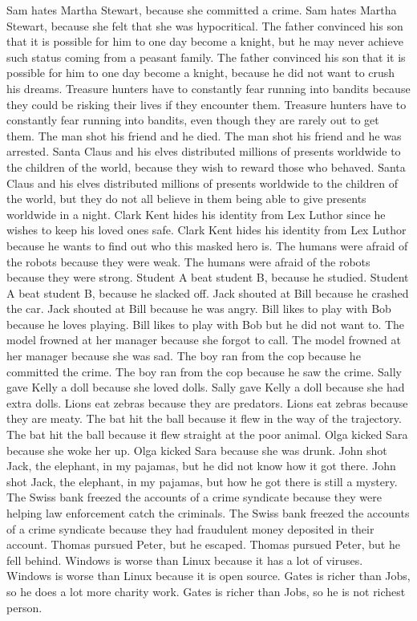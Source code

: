 \documentclass{article}
\begin{document}
\begin{enumerate}
	Sam hates Martha Stewart, because she committed a crime.
	Sam hates Martha Stewart, because she felt that she was hypocritical.
	The father convinced his son that it is possible for him to one day become a knight, but he may never achieve such status coming from a peasant family.
	The father convinced his son that it is possible for him to one day become a knight, because he did not want to crush his dreams.
	Treasure hunters have to constantly fear running into bandits because they could be risking their lives if they encounter them.
	Treasure hunters have to constantly fear running into bandits, even though they are rarely out to get them.
	The man shot his friend and he died.
	The man shot his friend and he was arrested.
	Santa Claus and his elves distributed millions of presents worldwide to the children of the world, because they wish to reward those who behaved.
	Santa Claus and his elves distributed millions of presents worldwide to the children of the world, but they do not all believe in them being able to give presents worldwide in a night.
	Clark Kent hides his identity from Lex Luthor since he wishes to keep his loved ones safe.
	Clark Kent hides his identity from Lex Luthor because he wants to find out who this masked hero is.
	The humans were afraid of the robots because they were weak.
	The humans were afraid of the robots because they were strong.
	Student A beat student B, because he studied.
	Student A beat student B, because he slacked off.
	Jack shouted at Bill because he crashed the car.
	Jack shouted at Bill because he was angry.
	Bill likes to play with Bob because he loves playing.
	Bill likes to play with Bob but he did not want to.
	The model frowned at her manager because she forgot to call.
	The model frowned at her manager because she was sad.
	The boy ran from the cop because he committed the crime.
	The boy ran from the cop because he saw the crime.
	Sally gave Kelly a doll because she loved dolls.
	Sally gave Kelly a doll because she had extra dolls.
	Lions eat zebras because they are predators.
	Lions eat zebras because they are meaty.
	The bat hit the ball because it flew in the way of the trajectory.
	The bat hit the ball because it flew straight at the poor animal.
	Olga kicked Sara because she woke her up.
	Olga kicked Sara because she was drunk.
	John shot Jack, the elephant, in my pajamas, but he did not know how it got there.
	John shot Jack, the elephant, in my pajamas, but how he got there is still a mystery.
	The Swiss bank freezed the accounts of a crime syndicate because they were helping law enforcement catch the criminals.
	The Swiss bank freezed the accounts of a crime syndicate because they had fraudulent money deposited in their account.
	Thomas pursued Peter, but he escaped.
	Thomas pursued Peter, but he fell behind.
	Windows is worse than Linux because it has a lot of viruses.
	Windows is worse than Linux because it is open source.
	Gates is richer than Jobs, so he does a lot more charity work.
	Gates is richer than Jobs, so he is not richest person.
\end{enumerate}
\end{document}
